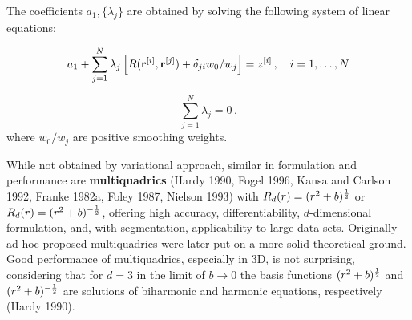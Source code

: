 The coefficients $a_1, \{\lambda _j\}$ are obtained by solving the following
system of linear equations:

$$
 a_1+\sum_{j=1}^N \lambda_j \left[R({\bf r}^{[i]},{\bf r}^{[j]})
+\delta_{ji}w_0/w_j \right] =z^{[i]}\, ,\quad i=1,\ldots,N
$$

$$
\sum_{j=1}^N \lambda _j =0\, .
$$
where $w_0/w_j$ are positive smoothing weights.


While not obtained by variational approach, similar in
formulation and performance are
{\bf multiquadrics} (Hardy 1990, Fogel 1996, Kansa and Carlson 1992,
 Franke 1982a, Foley 1987, Nielson 1993)  with $R_d(r)=(r^2+b)^{1\over 2}$
or $R_d(r)=(r^2+b)^{-{1\over 2}}$,
offering high accuracy, differentiability, $d$-dimensional formulation,
and, with segmentation,
 applicability to large data sets. Originally ad hoc proposed
 multiquadrics were later put on a more solid theoretical ground.
Good performance of multiquadrics, especially in 3D, is not surprising,
considering that for $d=3$ in the limit of $b \to 0$  the basis
functions $(r^2+b)^{1\over 2}$ and $(r^2+b)^{-{1\over 2}}$
are solutions of biharmonic and harmonic equations, respectively
(Hardy 1990).



\bye

